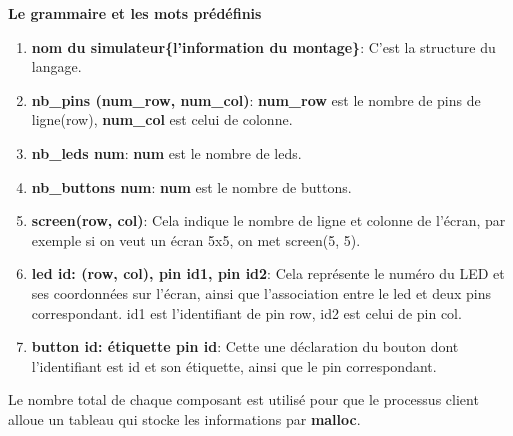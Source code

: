 \documentclass[14px]{article}
\begin{document}
	\begin{figure}[htbp]
	\end{figure}
	
	\textbf{Le grammaire et les mots prédéfinis}
	\begin{enumerate}
		\item \textbf{nom du simulateur\{l'information du montage\}}: C'est la structure du langage.
		\item \textbf{nb\_pins (num\_row, num\_col)}: \textbf{num\_row} est le nombre de pins de ligne(row), \textbf{num\_col} est celui de colonne.
		\item \textbf{nb\_leds num}: \textbf{num} est le nombre de leds.
		\item \textbf{nb\_buttons num}: \textbf{num} est le nombre de buttons.
		\item \textbf{screen(row, col)}: Cela indique le nombre de ligne et colonne de l'écran, par exemple si on veut un écran 5x5, on met screen(5, 5).
		\item \textbf{led id: (row, col), pin id1, pin id2}: Cela représente le numéro du LED et ses coordonnées sur l'écran, ainsi que l'association entre le led et deux pins correspondant. id1 est l'identifiant de pin row, id2 est celui de pin col.
		\item \textbf{button id: étiquette pin id}: Cette une déclaration du bouton dont l'identifiant est id et son étiquette, ainsi que le pin correspondant.
	\end{enumerate}
	Le nombre total de chaque composant est utilisé pour que le processus client alloue un tableau qui stocke les informations par \textbf{malloc}.
	
	
	\clearpage
	\pagestyle{fancy}
	\rhead{\thepage}
	\fancyfoot{}
	
	\clearpage
	
	
	
\end{document}
